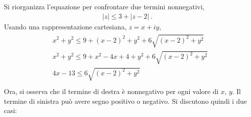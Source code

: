 \documentclass[letterpaper,10pt,italian]{jupyterBook}
\begin{document}
\sphinxAtStartPar
Si riorganizza l’equazione per confrontare due termini non\sphinxhyphen{}negativi,
\begin{equation*}
\begin{split}
  |z| \leq 3 + |z-2| \ .
\end{split}
\end{equation*}
\sphinxAtStartPar
Usando una rappresentazione cartesiana, \(z = x + i y\),
\begin{equation*}
\begin{split}\begin{aligned}
  & x^2 + y^2 \leq 9 + (x-2)^2 + y^2 + 6\sqrt{(x-2)^2+y^2} \\
  & x^2 + y^2 \leq 9 + x^2 - 4x + 4 + y^2 + 6\sqrt{(x-2)^2+y^2} \\
  & 4x - 13   \leq 6\sqrt{(x-2)^2+y^2} \\
\end{aligned}\end{split}
\end{equation*}
\sphinxAtStartPar
Ora, si osserva che il termine di destra è non\sphinxhyphen{}negativo per ogni valore di \(x\), \(y\). Il termine di sinistra può avere segno positivo o negativo. Si discutono quindi i due casi:
\end{document}
